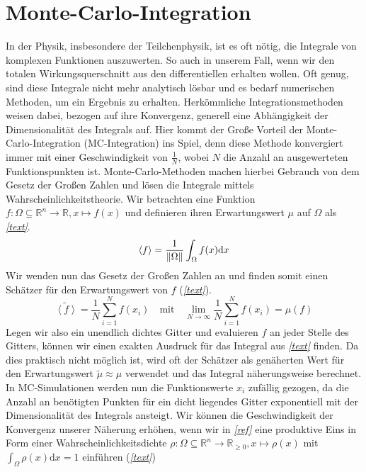 \section{Monte-Carlo-Integration}
In der Physik, insbesondere der Teilchenphysik, ist es oft nötig, die Integrale von komplexen Funktionen auszuwerten. So auch in unserem Fall, wenn wir den totalen Wirkungsquerschnitt aus den differentiellen erhalten wollen. Oft genug, sind diese Integrale nicht mehr analytisch lösbar und es bedarf numerischen Methoden, um ein Ergebnis zu erhalten. Herkömmliche Integrationsmethoden weisen dabei, bezogen auf ihre Konvergenz, generell eine Abhängigkeit der Dimensionalität des Integrals auf. Hier kommt der Große Vorteil der Monte-Carlo-Integration (MC-Integration) ins Spiel, denn diese Methode konvergiert immer mit einer Geschwindigkeit von $\frac{1}{N} $, wobei $N$ die Anzahl an ausgewerteten Funktionspunkten ist. Monte-Carlo-Methoden machen hierbei Gebrauch von dem Gesetz der Großen Zahlen und lösen die Integrale mittels Wahrscheinlichkeitstheorie.
\newline
\newline
Wir betrachten eine Funktion $f: \Omega \subseteq \mathbb{R}^n \rightarrow \mathbb{R}, x \mapsto f(x)$ und definieren ihren Erwartungswert $\mu$ auf $\Omega$ als \textit{\autoref{text}}.
\begin{equation}
\left\langle f\right\rangle  = \frac{1}{\norm{\Omega}}\int_{\Omega} f(x) \text{d}x 
\end{equation}
Wir wenden nun das Gesetz der Großen Zahlen an und finden somit einen Schätzer für den Erwartungswert von $f$ (\textit{\autoref{text}}).
\begin{equation}
\tilde{\left\langle f \right\rangle } = \frac{1}{N} \sum_{i=1}^{N} f(x_i) \quad \text{mit} \quad \lim_{N\rightarrow \infty} \frac{1}{N} \sum_{i=1}^{N} f(x_i) = \mu(f)
\end{equation}
Legen wir also ein unendlich dichtes Gitter und evaluieren $f$ an jeder Stelle des Gitters, können wir einen exakten Ausdruck für das Integral aus \textit{\autoref{text}} finden. Da dies praktisch nicht möglich ist, wird oft der Schätzer als genäherten Wert für den Erwartungswert $\tilde{\mu} \approx \mu$ verwendet und das Integral näherungsweise berechnet. In MC-Simulationen werden nun die Funktionswerte $x_i$ zufällig gezogen, da die Anzahl an benötigten Punkten für ein dicht liegendes Gitter exponentiell mit der Dimensionalität des Integrals ansteigt. Wir können die Geschwindigkeit der Konvergenz unserer Näherung erhöhen, wenn wir in \textit{\autoref{ref}} eine produktive Eins in Form einer Wahrscheinlichkeitsdichte $\rho: \Omega \subseteq \mathbb{R}^n \to \mathbb{R}_{\geq 0}, x \mapsto \rho(x)$ mit $\int_{\Omega} \rho(x) \text{d}x = 1$ einführen (\textit{\autoref{text}})
